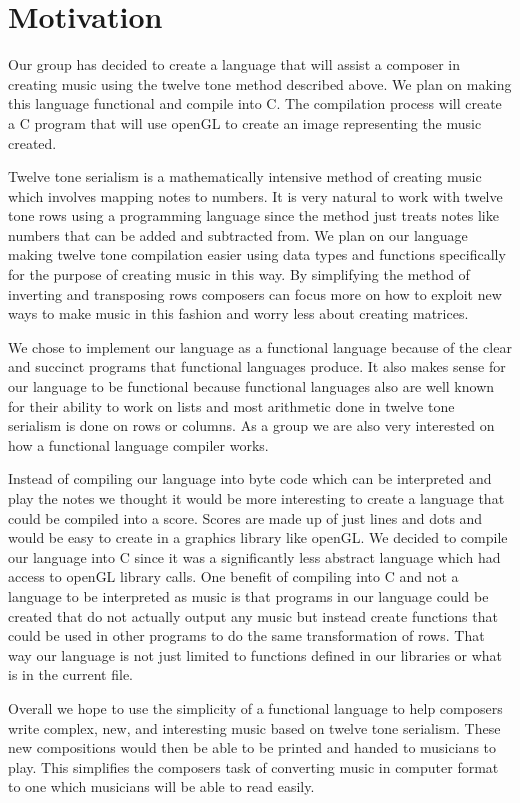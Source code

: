 \section{Motivation}

Our group has decided to create a language that will assist a composer in creating music 
using the twelve tone method described above. We plan on making this language 
functional and compile into C. The compilation process will create a C program 
that will use openGL to create an image representing the music created. 

Twelve tone serialism is a mathematically intensive method of creating music which 
involves mapping notes to numbers. It is very natural to work with twelve tone rows 
using a programming language since the method just treats notes like numbers that 
can be added and subtracted from. We plan on our language making twelve tone compilation 
easier using data types and functions specifically for the purpose of creating music in 
this way. By simplifying the method of inverting and transposing rows composers can focus 
more on how to exploit new ways to make music in this fashion and worry less about 
creating matrices. 

We chose to implement our language as a functional language because of the clear and 
succinct programs that functional languages produce. It also makes sense for our language 
to be functional because functional languages also are well known for their ability to 
work on lists and most arithmetic done in twelve tone serialism is done on rows or 
columns. As a group we are also very interested on how a functional language compiler 
works. 

Instead of compiling our language into byte code which can be interpreted and play the 
notes we thought it would be more interesting to create a language that could be compiled 
into a score. Scores are made up of just lines and dots and would be easy to create in 
a graphics library like openGL. We decided to compile our language into C since it was a 
significantly less abstract language which had access to openGL library calls. One benefit 
of compiling into C and not a language to be interpreted as music is that programs in our 
language could be created that do not actually output any music but instead create 
functions that could be used in other programs to do the same transformation of rows. 
That way our language is not just limited to functions defined in our libraries or 
what is in the current file. 

Overall we hope to use the simplicity of a functional language to help composers write 
complex, new, and interesting music based on twelve tone serialism. These new compositions 
would then be able to be printed and handed to musicians to play. This simplifies the 
composers task of converting music in computer format to one which musicians will be 
able to read easily. 
